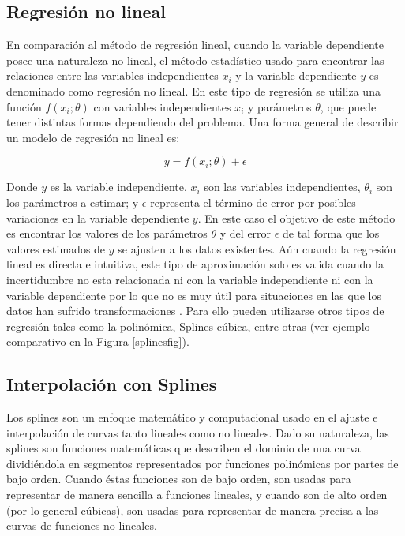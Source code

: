 \subsection{Regresión no lineal}

En comparación al método de regresión lineal, cuando la variable dependiente posee una naturaleza no lineal, el método estadístico usado para encontrar las relaciones entre las variables independientes $x_{i}$ y la variable dependiente $y$ es denominado como regresión no lineal. En este tipo de regresión se utiliza una función $f(x_{i};\theta)$ con variables independientes $x_{i}$ y parámetros $\theta$, que puede tener distintas formas dependiendo del problema. Una forma general de describir un modelo de regresión no lineal es:

\begin{equation}
    y = f(x_{i};\theta) + \epsilon
\end{equation}

Donde $y$ es la variable independiente, $x_{i}$ son las variables independientes, $\theta_{i}$ son los parámetros a estimar; y $\epsilon$ representa el término de error por posibles variaciones en la variable dependiente $y$. En este caso el objetivo de este método es encontrar los valores de los parámetros $\theta$ y del error $\epsilon$ de tal forma que los valores estimados de $y$ se ajusten a los datos existentes. Aún cuando la regresión lineal es directa e intuitiva, este tipo de aproximación solo es valida cuando la incertidumbre no esta relacionada ni con la variable independiente ni con la variable dependiente por lo que no es muy útil para situaciones en las que los datos han sufrido transformaciones \cite{nlreg}. Para ello pueden utilizarse otros tipos de regresión tales como la polinómica, Splines cúbica, entre otras (ver ejemplo comparativo en la Figura \ref{splinesfig}).

\subsection{Interpolación con Splines}
Los splines son un enfoque matemático y computacional usado en el ajuste e interpolación de curvas tanto lineales como no lineales. Dado su naturaleza, las splines son funciones matemáticas que describen el dominio de una curva dividiéndola en segmentos representados por funciones polinómicas por partes de bajo orden. Cuando éstas funciones son de bajo orden, son usadas para representar de manera sencilla a funciones lineales, y cuando son de alto orden (por lo general cúbicas), son usadas para representar de manera precisa a las curvas de funciones no lineales.

